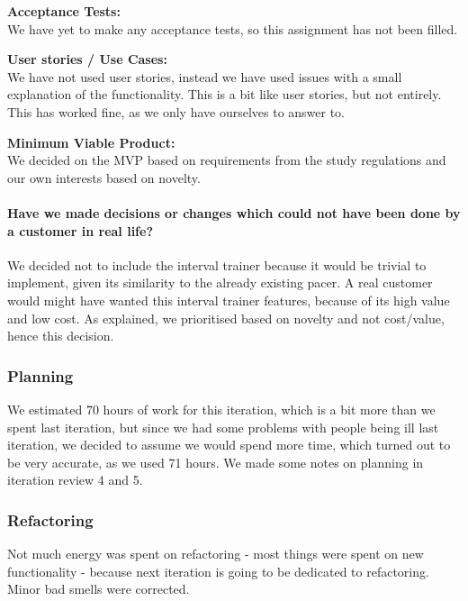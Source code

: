 \textbf{Acceptance Tests:}\\
We have yet to make any acceptance tests, so this assignment has not been filled.

\textbf{User stories / Use Cases:}\\
We have not used user stories, instead we have used issues with a small explanation of the functionality. This is a bit like user stories, but not entirely. This has worked fine, as we only have ourselves to answer to.

\textbf{Minimum Viable Product:}\\
We decided on the MVP based on requirements from the study regulations and our own interests based on novelty.

\paragraph{Have we made decisions or changes which could not have been done by a customer in real life?}
We decided not to include the interval trainer because it would be trivial to implement, given its similarity to the already existing pacer.
A real customer would might have wanted this interval trainer features, because of its high value and low cost. As explained, we prioritised based on novelty and not cost/value, hence this decision.


\subsubsection{Planning}
We estimated 70 hours of work for this iteration, which is a bit more than we spent last iteration, but since we had some problems with people being ill last iteration, we decided to assume we would spend more time, which turned out to be very accurate, as we used 71 hours. We made some notes on planning in iteration review 4 and 5.

\subsubsection{Refactoring}
Not much energy was spent on refactoring - most things were spent on new functionality - because next iteration is going to be dedicated to refactoring.
Minor bad smells were corrected.

